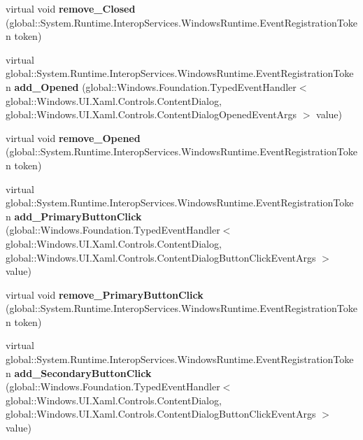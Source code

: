 \begin{DoxyCompactItemize}
virtual void {\bfseries remove\+\_\+\+Closed} (global\+::\+System.\+Runtime.\+Interop\+Services.\+Windows\+Runtime.\+Event\+Registration\+Token token)
\item 
\mbox{\label{class_windows_1_1_u_i_1_1_xaml_1_1_controls_1_1_content_dialog_a140644918023f750ab438dadf16adbc6}} 
virtual global\+::\+System.\+Runtime.\+Interop\+Services.\+Windows\+Runtime.\+Event\+Registration\+Token {\bfseries add\+\_\+\+Opened} (global\+::\+Windows.\+Foundation.\+Typed\+Event\+Handler$<$ global\+::\+Windows.\+U\+I.\+Xaml.\+Controls.\+Content\+Dialog, global\+::\+Windows.\+U\+I.\+Xaml.\+Controls.\+Content\+Dialog\+Opened\+Event\+Args $>$ value)
\item 
\mbox{\label{class_windows_1_1_u_i_1_1_xaml_1_1_controls_1_1_content_dialog_aca373dad7a49f1f4e1bd7b41f5ea7703}} 
virtual void {\bfseries remove\+\_\+\+Opened} (global\+::\+System.\+Runtime.\+Interop\+Services.\+Windows\+Runtime.\+Event\+Registration\+Token token)
\item 
\mbox{\label{class_windows_1_1_u_i_1_1_xaml_1_1_controls_1_1_content_dialog_a3e36b19b3f4893d9fb0f02a0521e5d93}} 
virtual global\+::\+System.\+Runtime.\+Interop\+Services.\+Windows\+Runtime.\+Event\+Registration\+Token {\bfseries add\+\_\+\+Primary\+Button\+Click} (global\+::\+Windows.\+Foundation.\+Typed\+Event\+Handler$<$ global\+::\+Windows.\+U\+I.\+Xaml.\+Controls.\+Content\+Dialog, global\+::\+Windows.\+U\+I.\+Xaml.\+Controls.\+Content\+Dialog\+Button\+Click\+Event\+Args $>$ value)
\item 
\mbox{\label{class_windows_1_1_u_i_1_1_xaml_1_1_controls_1_1_content_dialog_ad87d51f3f0f3f6e07586f13e8912c5dc}} 
virtual void {\bfseries remove\+\_\+\+Primary\+Button\+Click} (global\+::\+System.\+Runtime.\+Interop\+Services.\+Windows\+Runtime.\+Event\+Registration\+Token token)
\item 
\mbox{\label{class_windows_1_1_u_i_1_1_xaml_1_1_controls_1_1_content_dialog_aa769bea5ba29f6714032e97410b15b2f}} 
virtual global\+::\+System.\+Runtime.\+Interop\+Services.\+Windows\+Runtime.\+Event\+Registration\+Token {\bfseries add\+\_\+\+Secondary\+Button\+Click} (global\+::\+Windows.\+Foundation.\+Typed\+Event\+Handler$<$ global\+::\+Windows.\+U\+I.\+Xaml.\+Controls.\+Content\+Dialog, global\+::\+Windows.\+U\+I.\+Xaml.\+Controls.\+Content\+Dialog\+Button\+Click\+Event\+Args $>$ value)

\end{DoxyCompactItemize}
